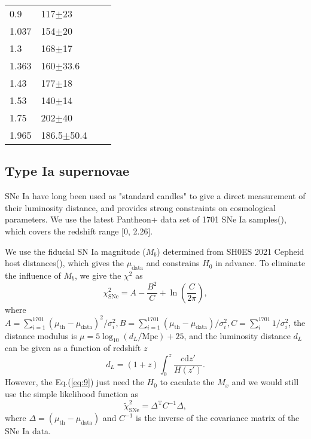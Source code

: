 \documentclass{aa}
\begin{document}
\begin{table}[htbp]
\begin{tabular}{llll}
         0.9 & 117$\pm$23 & \cite{PhysRevD.71.123001} \\
         1.037 & 154$\pm$20 & \cite{M.Moresco_2012} \\
         1.3 & 168$\pm$17 & \cite{PhysRevD.71.123001} \\
         1.363 & 160$\pm$33.6 & \cite{10.1093/mnrasl/slv037} \\
         1.43 & 177$\pm$18 & \cite{PhysRevD.71.123001} \\
         1.53 & 140$\pm$14 & \cite{PhysRevD.71.123001} \\
         1.75 & 202$\pm$40 & \cite{PhysRevD.71.123001} \\
         1.965 & 186.5$\pm$50.4 & \cite{10.1093/mnrasl/slv037} \\
         \hline    
      \end{tabular}
      \label{tab:1}
   \end{table}

\subsection{Type Ia supernovae}

   SNe Ia have long been used as "standard candles" to give a direct
   measurement of their luminosity distance, and provides strong constraints
   on cosmological parameters. We use the latest Pantheon+ data set of 1701 
   SNe Ia samples(\cite{Scolnic_2022}), which covers the redshift range [0, 2.26].
   
   We use the fiducial SN Ia magnitude ($M_b$) determined from SH0ES 2021 Cepheid 
   host distances(\cite{Riess_2022}), which gives the $\mu_\text{data}$ and constrains $H_0$
   in advance. To eliminate the influence of $M_b$, we give the $\chi^2$
   as \begin{equation}
      \chi_{\text{SNe}}^2=A-\frac{B^2}{C}+\ln\left(\frac{C}{2\pi}\right),
   \end{equation}
   where $A=\sum_{i=1}^{1701}(\mu_{\text{th}}-\mu_{\text{data}})^2/\sigma_i^2,
   B=\sum_{i=1}^{1701}(\mu_{\text{th}}-\mu_{\text{data}})/\sigma_i^2,C=\sum_i^{1701}1/\sigma_i^2$,
   the distance modulus is $\mu=5\log_{10}(d_L/\text{Mpc})+25$, and the
   luminosity distance $d_L$ can be given as a function of redshift $z$
   \begin{equation}
      d_L=(1+z)\int_0^z\frac{c\mathrm{d}z'}{H(z')}.
   \end{equation}
   However, the Eq.(\ref{eq:9}) just need the $H_0$ to caculate the $M_x$
   and we would still use the simple likelihood function as
   \begin{equation}
      \tilde{\chi}_{\text{SNe}}^2=\Delta^{\text{T}}C^{-1}\Delta,
   \end{equation}
   where $\Delta=(\mu_{\text{th}}-\mu_{\text{data}})$ and $C^{-1}$ is the inverse of the
   covariance matrix of the SNe Ia data.
\end{document}
